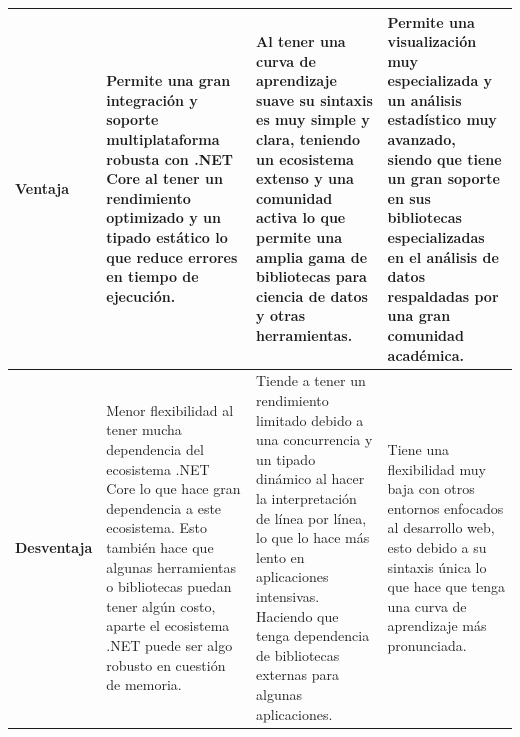 \begin{landscape}
\begin{table}[h!]
\begin{tabular}{|>{\raggedright\arraybackslash}p{2.5cm}|>{\raggedright\arraybackslash}p{6.7cm}|>{\raggedright\arraybackslash}p{7cm}|>{\raggedright\arraybackslash}p{6.7cm}|}
    \hline
    \textbf{Ventaja} & 
    Permite una gran integración y soporte multiplataforma robusta con .NET Core al tener un rendimiento optimizado y un tipado estático lo que reduce errores en tiempo de ejecución.
    & 
    Al tener una curva de aprendizaje suave su sintaxis es muy simple y clara, teniendo un ecosistema extenso y una comunidad activa lo que permite una amplia gama de bibliotecas para ciencia de datos y otras herramientas.
    & 
    Permite una visualización muy especializada y un análisis estadístico muy avanzado, siendo que tiene un gran soporte en sus bibliotecas especializadas en el análisis de datos respaldadas por una gran comunidad académica.
    \\
    \hline
    \textbf{Desventaja} & 
    Menor flexibilidad al tener mucha dependencia del ecosistema .NET Core lo que hace gran dependencia a este ecosistema. Esto también hace que algunas herramientas o bibliotecas puedan tener algún costo, aparte el ecosistema .NET puede ser algo robusto en cuestión de memoria.
    & 
    Tiende a tener un rendimiento limitado debido a una concurrencia y un tipado dinámico al hacer la interpretación de línea por línea, lo que lo hace más lento en aplicaciones intensivas. Haciendo que tenga dependencia de bibliotecas externas para algunas aplicaciones.
    & 
    Tiene una flexibilidad muy baja con otros entornos enfocados al desarrollo web, esto debido a su sintaxis única lo que hace que tenga una curva de aprendizaje más pronunciada.
    \\
    \hline
    \end{tabular}
\end{table}

\endgroup
\end{landscape}
